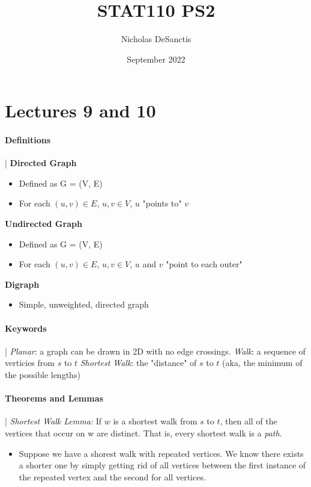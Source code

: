 \documentclass{article}
\title{STAT110 PS2}
\author{Nicholas DeSanctis}
\date{September 2022}
\begin{document}
\maketitle

\section*{Lectures 9 and 10}
\paragraph*{Definitions} |
\newline
\newline
\textbf{Directed Graph}
\begin{itemize}
  \item Defined as G = (V, E)
  \item For each $(u, v) \in E$, $u, v \in V$, $u$ "points to" $v$
\end{itemize}
\textbf{Undirected Graph} 
\begin{itemize}
  \item Defined as G = (V, E)
  \item For each $(u, v) \in E$, $u, v \in V$, $u$ and $v$ "point to each outer"
\end{itemize}
\textbf{Digraph}
\begin{itemize}
  \item Simple, unweighted, directed graph
\end{itemize}
\paragraph*{Keywords} |
\newline
\newline
\emph{Planar}: a graph can be drawn in 2D with no edge crossings.
\newline
\newline
\emph{Walk}: a sequence of verticies from $s$ to $t$
\newline
\newline
\emph{Shortest Walk}: the "distance" of $s$ to $t$ (aka, the minimum of the possible lengths)
\paragraph*{Theorems and Lemmas} |
\newline
\newline
\emph{Shortest Walk Lemma: } If $w$ is a shortest walk from $s$ to $t$, then all of the vertices that occur on w are distinct.
That is, every shortest walk is a \emph{path}.
\begin{itemize}
  \item Suppose we have a shorest walk with repeated vertices. We know there exists a shorter one
  by simply getting rid of all vertices between the first instance of the repeated vertex and the second
  for all vertices.
\end{itemize}
\end{document}
